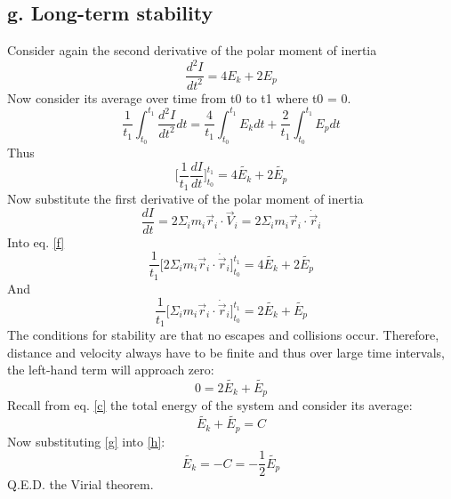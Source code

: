 \subsection{g. Long-term stability}
Consider again the second derivative of the polar moment of inertia
\begin{equation}
\frac{d^2I}{dt^2} = 4E_k + 2E_p
\end{equation}
Now consider its average over time from t0 to t1 where t0 = 0.
\begin{equation}
\frac{1}{t_1} \int_{t_0}^{t_1} \frac{d^2I}{dt^2}dt = \frac{4}{t_1} \int_{t_0}^{t_1} E_k dt + \frac{2}{t_1} \int_{t_0}^{t_1} E_p dt
\end{equation}
Thus
\begin{equation}
\Bigg[\frac{1}{t_1} \frac{dI}{dt}\Bigg]_{t_0}^{t_1} = 4 \tilde{E_k} + 2 \tilde{E_p}
\label{f}
\end{equation}
Now substitute the first derivative of the polar moment of inertia
\begin{equation}
\frac{dI}{dt} = 2 \Sigma_i m_i \vec{r}_i \cdot \vec{V}_i = 2 \Sigma_i m_i \vec{r}_i \cdot \dot{\vec{r}}_i 
\end{equation}
Into eq. \ref{f}
\begin{equation}
\frac{1}{t_1} \Bigg[2 \Sigma_i m_i \vec{r}_i \cdot \dot{\vec{r}}_i\Bigg]_{t_0}^{t_1} = 4 \tilde{E_k} + 2 \tilde{E_p}
\end{equation}
And
\begin{equation}
\frac{1}{t_1} \Bigg[\Sigma_i m_i \vec{r}_i \cdot \dot{\vec{r}}_i\Bigg]_{t_0}^{t_1} = 2 \tilde{E_k} + \tilde{E_p}
\end{equation}
The conditions for stability are that no escapes and collisions occur. Therefore, distance and velocity always have to be finite and thus over large time intervals, the left-hand term will approach zero:
\begin{equation}
0 = 2 \tilde{E_k} + \tilde{E_p}
\label{g}
\end{equation}
Recall from eq. \ref{c} the total energy of the system and consider its average:
\begin{equation}
\tilde{E_k} + \tilde{E_p} = C
\label{h}
\end{equation}
Now substituting \ref{g} into \ref{h}:
\begin{equation}
\tilde{E_k} = -C = -\frac{1}{2} \tilde{E_p}
\end{equation}
Q.E.D. the Virial theorem.
